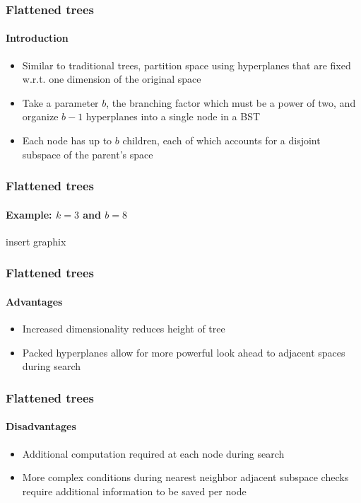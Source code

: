 
\begin{frame}
  \frametitle{Flattened \kd trees}
  \framesubtitle{Introduction}

  \begin{itemize}
    \item Similar to traditional \kd trees, partition space using hyperplanes that are 
      fixed w.r.t. one dimension of the original space
    \item Take a parameter $b$, the branching factor which must be a power of two, and
      organize $b-1$ hyperplanes into a single node in a BST
    \item Each node has up to $b$ children, each of which accounts for a disjoint subspace 
      of the parent's space
  \end{itemize}

\end{frame}

\begin{frame}
  \frametitle{Flattened \kd trees}
  \framesubtitle{Example: $k=3$ and $b=8$}

  insert graphix

\end{frame}

\begin{frame}
  \frametitle{Flattened \kd trees}
  \framesubtitle{Advantages}

  \begin{itemize}
    \item Increased dimensionality reduces height of tree
    \item Packed hyperplanes allow for more powerful look ahead to adjacent
      spaces during search
  \end{itemize}

\end{frame}

\begin{frame}
  \frametitle{Flattened \kd trees}
  \framesubtitle{Disadvantages}

  \begin{itemize}
    \item Additional computation required at each node during search
    \item More complex conditions during nearest neighbor adjacent subspace
      checks require additional information to be saved per node
  \end{itemize}

\end{frame}

